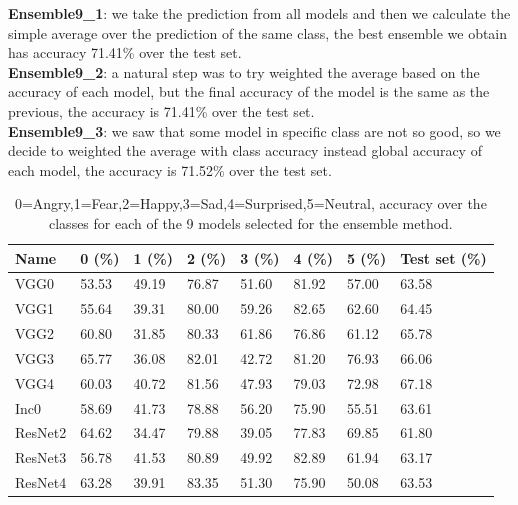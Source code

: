 \documentclass[10pt,twocolumn,letterpaper]{article}
\begin{document}
\newpage
\textbf{Ensemble9\_1}: we take the prediction from all models and then we calculate the simple average over the prediction of the same class, the best ensemble we obtain has accuracy 71.41\% over the test set.\\
\textbf{Ensemble9\_2}: a natural step was to try weighted the average based on the accuracy of each model, but the final accuracy of the model is the same as the previous, the accuracy is 71.41\% over the test set.\\
\textbf{Ensemble9\_3}: we saw that some model in specific class are not so good, so we decide to weighted the average with class accuracy instead global accuracy of each model, the accuracy is 71.52\% over the test set.

\def\arraystretch{1.2}
\begin{table}[H]
   \scriptsize
   \begin{tabular}{L{1.1cm}C{0.5cm}C{0.5cm}C{0.5cm}C{0.5cm}C{0.5cm}C{0.5cm}C{0.8cm}}
      \hline
      Name    & 0 (\%) & 1 (\%) & 2 (\%) & 3 (\%) & 4 (\%) & 5 (\%) & Test set (\%) \\
      \hline\hline
      VGG0    & 53.53  & 49.19  & 76.87  & 51.60  & 81.92  & 57.00  & 63.58         \\
      VGG1    & 55.64  & 39.31  & 80.00  & 59.26  & 82.65  & 62.60  & 64.45         \\
      VGG2    & 60.80  & 31.85  & 80.33  & 61.86  & 76.86  & 61.12  & 65.78         \\
      VGG3    & 65.77  & 36.08  & 82.01  & 42.72  & 81.20  & 76.93  & 66.06         \\
      VGG4    & 60.03  & 40.72  & 81.56  & 47.93  & 79.03  & 72.98  & 67.18         \\
      Inc0    & 58.69  & 41.73  & 78.88  & 56.20  & 75.90  & 55.51  & 63.61         \\
      ResNet2 & 64.62  & 34.47  & 79.88  & 39.05  & 77.83  & 69.85  & 61.80         \\
      ResNet3 & 56.78  & 41.53  & 80.89  & 49.92  & 82.89  & 61.94  & 63.17         \\
      ResNet4 & 63.28  & 39.91  & 83.35  & 51.30  & 75.90  & 50.08  & 63.53         \\
      \hline
   \end{tabular}
   \caption{ 0=Angry,1=Fear,2=Happy,3=Sad,4=Surprised,5=Neutral, accuracy over the classes for each of the 9 models selected for the ensemble method.}
   \label{table:modelli9}
\end{table}
\end{document}
